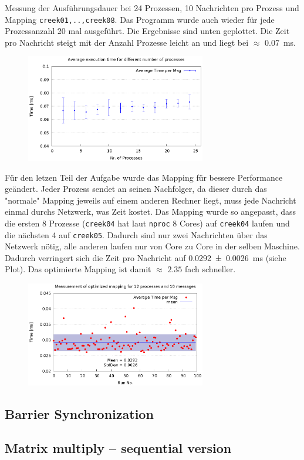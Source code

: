 \documentclass[a4paper,11pt]{scrartcl}
\begin{document}
Messung der Ausführungsdauer bei 24 Prozessen, 10 Nachrichten pro Prozess und Mapping \verb+creek01,..,creek08+. Das Programm wurde auch wieder für jede Prozessanzahl 20 mal ausgeführt. Die Ergebnisse sind unten geplottet. Die Zeit pro Nachricht steigt mit der Anzahl Prozesse leicht an und liegt bei $\approx$ \SI{0.07}{\milli\second}.\\


\begin{figure}[h!]
    \centering
    \includegraphics[width=0.7\textwidth,keepaspectratio]{2_1/data/time.eps}
\end{figure}


Für den letzen Teil der Aufgabe wurde das Mapping für bessere Performance geändert. Jeder Prozess sendet an seinen Nachfolger, da dieser durch das "normale" Mapping jeweils auf einem anderen Rechner liegt, muss jede Nachricht einmal durchs Netzwerk, was Zeit kostet. 
Das Mapping wurde so angepasst, dass die ersten 8 Prozesse (\verb+creek04+ hat laut \verb+nproc+ 8 Cores) auf \verb+creek04+ laufen und die nächsten 4 auf \verb+creek05+. Dadurch sind nur zwei Nachrichten über das Netzwerk nötig, alle anderen laufen nur von Core zu Core in der selben Maschine. \\

Dadurch verringert sich die Zeit pro Nachricht auf \SI[multi-part-units=single]{0.0292(26)}{\milli\second} (siehe Plot). Das optimierte Mapping ist damit $\approx$ $2.35$ fach schneller.

\begin{figure}[h!]
    \centering
    \includegraphics[width=0.7\textwidth,keepaspectratio]{2_1/data/opt.eps}
\end{figure}




\subsection{Barrier Synchronization}


\subsection{Matrix multiply – sequential version}
\end{document}
